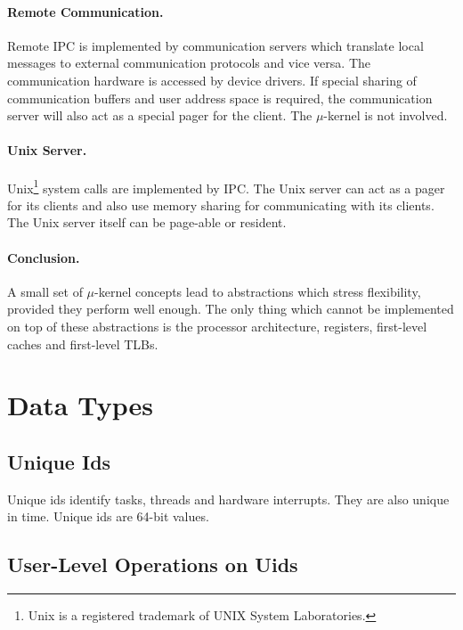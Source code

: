 \documentclass[a4paper,11pt,twoside,dvips]{book}
\newcommand{\micro}{$\mu$}
\begin{document}
 
\paragraph{Remote Communication.} 
Remote IPC is implemented by communication
servers which translate local messages to external communication protocols
and vice versa. The communication hardware is accessed by device drivers.
If special sharing of communication
buffers and user address space is required, the communication server will
also act as a special pager for the client. The \micro-kernel is not involved. 
 
 
\paragraph{Unix Server.} 
Unix\footnote{Unix is a registered trademark of UNIX System Laboratories.}
system calls
are implemented by IPC. The Unix server can act as a pager for its clients
and also use memory sharing for communicating with its clients. The Unix
server itself can be page-able or resident. 
 
 
\paragraph{Conclusion.} 
A small set of \micro-kernel concepts lead to abstractions
which stress flexibility, provided they perform well enough. The only thing
which cannot be implemented on top of these abstractions is the processor
architecture, registers, first-level caches and first-level TLBs. 
 
 
 
\clearpage 
 
 
\section{Data Types} 
 
\subsection{Unique Ids} 
 
Unique ids identify tasks, threads and hardware interrupts. They are also
unique in time. Unique ids are 64-bit values. 
 
 
\subsection{User-Level Operations on Uids} 
 
\end{document}
